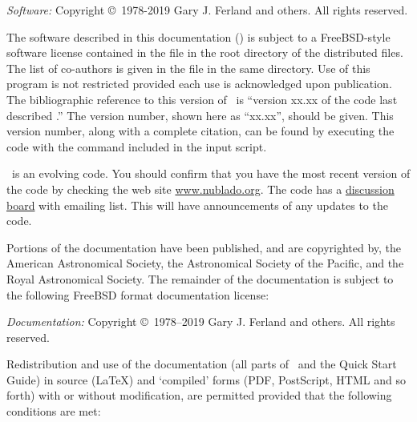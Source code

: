 {\small
\noindent
{\em Software:} Copyright \copyright\ 1978-2019 Gary J. Ferland and others. All rights reserved.

\vspace{1em}

\noindent
The software described in this documentation (\Cloudy) is subject
to a FreeBSD-style software license
contained in the file  in the
root directory of the distributed files.
The list of co-authors is given in the file
 in the same directory.
Use of this program is not restricted provided each use is
acknowledged upon publication.
The bibliographic reference to this version of \Cloudy\ is
``version xx.xx
of the code last described \citet{CloudyReview}.''
The version number, shown here as ``xx.xx'', should be
given.
This version number, along with a complete citation,
can be found by executing the code with the 
 command included in the input script.

\vspace{1em}

\noindent
\Cloudy\ is an evolving code.
You should confirm that you have the most recent
version of the code by checking the web site
\href{http://www.nublado.org}{www.nublado.org}.
The code has a
\href{https://cloudyastrophysics.groups.io}{discussion board} with emailing list.
This will have announcements of any updates to the code.\par

\vspace{1em}

\noindent
Portions of the documentation have been published, and are copyrighted by, the
American Astronomical Society, the Astronomical Society of the Pacific, and
the Royal Astronomical Society. The remainder of the documentation is subject
to the following FreeBSD format documentation license:

\vspace{1em}

\noindent
{\em Documentation:} Copyright \copyright\ 1978--2019 Gary J. Ferland and others. All rights reserved.

\vspace{1em}

\noindent
Redistribution and use of the documentation (all parts of \Hazy\ and the
Quick Start Guide) in source (\LaTeX) and `compiled' forms (PDF, PostScript,
HTML and so forth) with or without modification, are permitted provided that
the following conditions are met:

}
